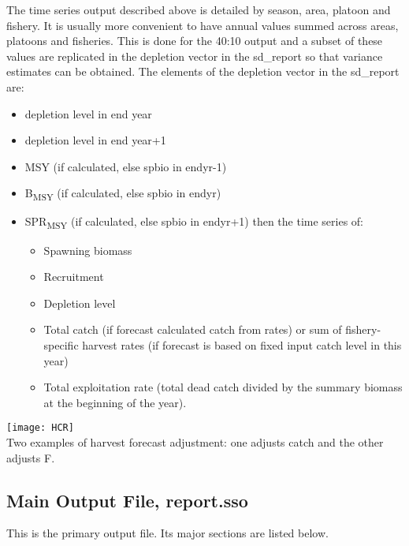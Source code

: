 The time series output described above is detailed by season, area, platoon and fishery.  It is usually more convenient to have annual values summed across areas, platoons and fisheries.  This is done for the 40:10 output and a subset of these values are replicated in the depletion vector in the sd\_report so that variance estimates can be obtained.  The elements of the depletion vector in the sd\_report are:
\begin{itemize}
	\item depletion level in end year
	\item depletion level in end year+1
	\item MSY (if calculated, else spbio in endyr-1)
	\item B\textsubscript{MSY} (if calculated, else spbio in endyr)
	\item SPR\textsubscript{MSY} (if calculated, else spbio in endyr+1) then the time series of:
	\begin{itemize}
		\item Spawning biomass
		\item Recruitment
		\item Depletion level
		\item Total catch (if forecast calculated catch from rates) or sum of fishery-specific harvest rates (if forecast is based on fixed input catch level in this year)
		\item Total exploitation rate (total dead catch divided by the summary biomass at the beginning of the year).
	\end{itemize}
\end{itemize}

\begin{center}
	\texttt{[image: HCR]}\\
	Two examples of harvest forecast adjustment: one adjusts catch and the other adjusts F.
\end{center}

\subsection{Main Output File, report.sso}
This is the primary output file.  Its major sections are listed below.  

